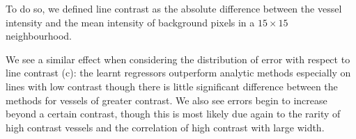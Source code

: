 To do so, we defined line contrast as the absolute difference between the vessel intensity and the mean intensity of background pixels in a $15{\times}15$ neighbourhood.

We see a similar effect when considering the distribution of error with respect to line contrast (c): the learnt regressors outperform analytic methods especially on lines with low contrast though there is little significant difference between the methods for vessels of greater contrast. We also see errors begin to increase beyond a certain contrast, though this is most likely due again to the rarity of high contrast vessels and the correlation of high contrast with large width.